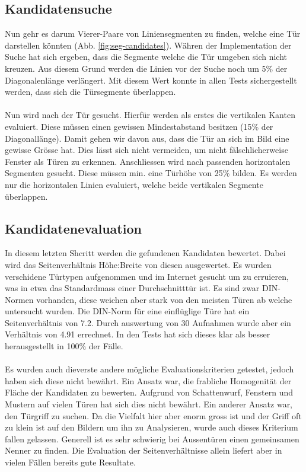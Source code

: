 \subsection{Kandidatensuche}
Nun gehr es darum Vierer-Paare von Liniensegmenten zu finden, welche eine Tür darstellen könnten (Abb. \ref{fig:seg-candidates}). Währen der Implementation der Suche hat sich ergeben, dass die Segmente welche die Tür umgeben sich nicht kreuzen. Aus diesem Grund werden die Linien vor der Suche noch um 5\% der Diagonalenlänge verlängert. Mit diesem Wert konnte in allen Tests sichergestellt werden, dass sich die Türsegmente überlappen. 
\paragraph{}
Nun wird nach der Tür gesucht. Hierfür werden als erstes die vertikalen Kanten evaluiert. Diese müssen einen gewissen Mindestabstand besitzen (15\% der Diagonallänge). Damit gehen wir davon aus, dass die Tür an sich im Bild eine gewisse Grösse hat. Dies lässt sich nicht vermeiden, um nicht fälschlicherweise Fenster als Türen zu erkennen. Anschliessen wird nach passenden horizontalen Segmenten gesucht. Diese müssen min. eine Türhöhe von 25\% bilden. Es werden nur die horizontalen Linien evaluiert, welche beide vertikalen Segmente überlappen.

\subsection{Kandidatenevaluation}
In diesem letzten Shcritt werden die gefundenen Kandidaten bewertet. Dabei wird das Seitenverhältnis Höhe:Breite von diesen ausgewertet. Es wurden verschidene Türtypen aufgenommen und im Internet gesucht um zu erruieren, was in etwa das Standardmass einer Durchschnitttür ist. Es sind zwar DIN-Normen vorhanden, diese weichen aber stark von den meisten Türen ab welche untersucht wurden. Die DIN-Norm für eine einflüglige Türe hat ein Seitenverhältnis von 7.2. Durch auswertung von 30 Aufnahmen wurde aber ein Verhältnis von 4.91 errechnet. In den Tests hat sich dieses klar als besser herausgestellt in 100\% der Fälle. 
\paragraph{}
Es wurden auch dieverste andere mögliche Evaluationskriterien getestet, jedoch haben sich diese nicht bewährt. Ein Ansatz war, die frabliche Homogenität der Fläche der Kandidaten zu bewerten. Aufgrund von Schattenwurf, Fenstern und Mustern auf vielen Türen hat sich dies nicht bewährt. Ein anderer Ansatz war, den Türgriff zu suchen. Da die Vielfalt hier aber enorm gross ist und der Griff oft zu klein ist auf den Bildern um ihn zu Analysieren, wurde auch dieses Kriterium fallen gelassen. Generell ist es sehr schwierig bei Aussentüren einen gemeinsamen Nenner zu finden. Die Evaluation der Seitenverhältnisse allein liefert aber in vielen Fällen bereits gute Resultate.

